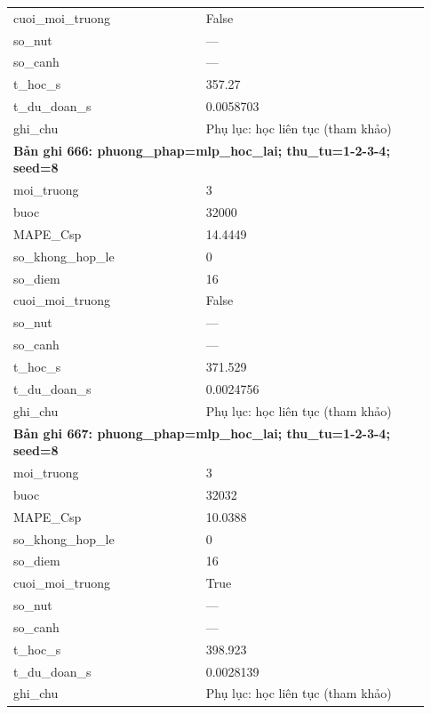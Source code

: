 \begin{longtable}{p{0.43\linewidth}p{0.50\linewidth}}
cuoi\_\allowbreak moi\_\allowbreak truong & False \\
so\_\allowbreak nut & — \\
so\_\allowbreak canh & — \\
t\_\allowbreak hoc\_\allowbreak s & 357.27 \\
t\_\allowbreak du\_\allowbreak doan\_\allowbreak s & 0.0058703 \\
ghi\_\allowbreak chu & Phụ lục: học liên tục (tham khảo) \\
\midrule
\multicolumn{2}{p{0.95\linewidth}}{\textbf{Bản ghi 666: phuong\_phap=mlp\_hoc\_lai; thu\_tu=1-2-3-4; seed=8}} \\
moi\_\allowbreak truong & 3 \\
buoc & 32000 \\
MAPE\_\allowbreak Csp & 14.4449 \\
so\_\allowbreak khong\_\allowbreak hop\_\allowbreak le & 0 \\
so\_\allowbreak diem & 16 \\
cuoi\_\allowbreak moi\_\allowbreak truong & False \\
so\_\allowbreak nut & — \\
so\_\allowbreak canh & — \\
t\_\allowbreak hoc\_\allowbreak s & 371.529 \\
t\_\allowbreak du\_\allowbreak doan\_\allowbreak s & 0.0024756 \\
ghi\_\allowbreak chu & Phụ lục: học liên tục (tham khảo) \\
\midrule
\multicolumn{2}{p{0.95\linewidth}}{\textbf{Bản ghi 667: phuong\_phap=mlp\_hoc\_lai; thu\_tu=1-2-3-4; seed=8}} \\
moi\_\allowbreak truong & 3 \\
buoc & 32032 \\
MAPE\_\allowbreak Csp & 10.0388 \\
so\_\allowbreak khong\_\allowbreak hop\_\allowbreak le & 0 \\
so\_\allowbreak diem & 16 \\
cuoi\_\allowbreak moi\_\allowbreak truong & True \\
so\_\allowbreak nut & — \\
so\_\allowbreak canh & — \\
t\_\allowbreak hoc\_\allowbreak s & 398.923 \\
t\_\allowbreak du\_\allowbreak doan\_\allowbreak s & 0.0028139 \\
ghi\_\allowbreak chu & Phụ lục: học liên tục (tham khảo) \\

\end{longtable}
